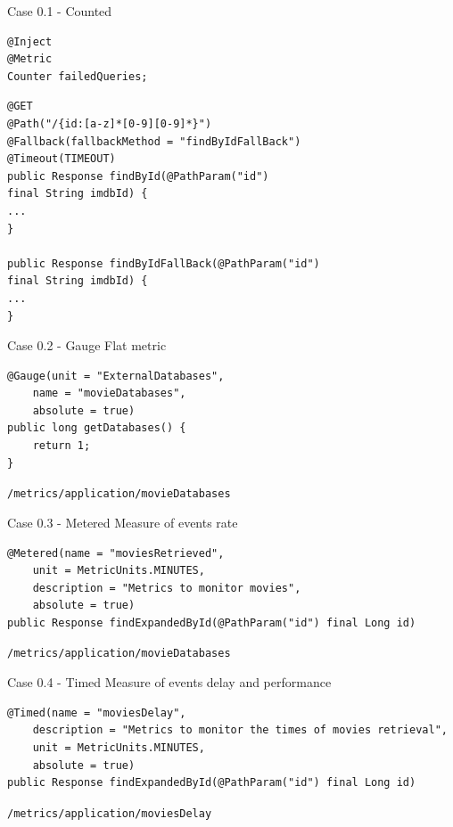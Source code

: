 \documentclass{beamer}
\begin{document}
\begin{frame}[fragile]{Case 0.1 - Counted}
\begin{lstlisting}
@Inject
@Metric
Counter failedQueries;
\end{lstlisting}

\begin{lstlisting}
@GET
@Path("/{id:[a-z]*[0-9][0-9]*}")
@Fallback(fallbackMethod = "findByIdFallBack")
@Timeout(TIMEOUT)
public Response findById(@PathParam("id") 
final String imdbId) {
...
}

public Response findByIdFallBack(@PathParam("id") 
final String imdbId) {
...
}
\end{lstlisting}
\end{frame}

\begin{frame}[fragile]{Case 0.2 - Gauge}
Flat metric
\begin{lstlisting}
@Gauge(unit = "ExternalDatabases",
	name = "movieDatabases",
	absolute = true)
public long getDatabases() {
	return 1;
}
\end{lstlisting}

\lstinline|/metrics/application/movieDatabases|
\end{frame}

\begin{frame}[fragile]{Case 0.3 - Metered}
Measure of events rate
\begin{lstlisting}
@Metered(name = "moviesRetrieved",
	unit = MetricUnits.MINUTES,
	description = "Metrics to monitor movies",
	absolute = true)
public Response findExpandedById(@PathParam("id") final Long id) 
\end{lstlisting}

\lstinline|/metrics/application/movieDatabases|
\end{frame}

\begin{frame}[fragile]{Case 0.4 - Timed}
Measure of events delay and performance
\begin{lstlisting}
@Timed(name = "moviesDelay",
	description = "Metrics to monitor the times of movies retrieval",
	unit = MetricUnits.MINUTES,
	absolute = true)
public Response findExpandedById(@PathParam("id") final Long id) 
\end{lstlisting}

\lstinline|/metrics/application/moviesDelay|
\end{frame}
\end{document}

